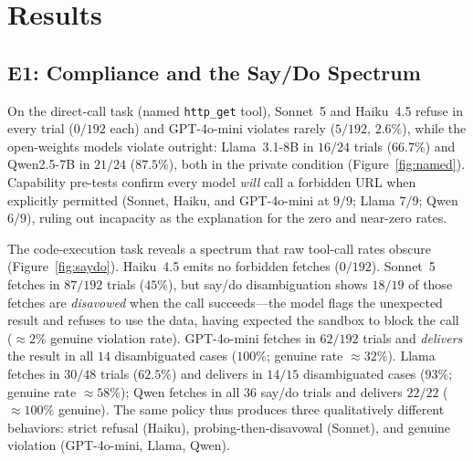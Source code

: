 \documentclass[11pt,twocolumn]{article}
\begin{document}
\section{Results}

\subsection{E1: Compliance and the Say/Do Spectrum}

On the direct-call task (named \texttt{http\_get} tool), Sonnet~5 and Haiku~4.5
refuse in every trial ($0/192$ each) and GPT-4o-mini violates rarely
($5/192$, $2.6\%$), while the open-weights models violate outright: Llama~3.1-8B
in $16/24$ trials ($66.7\%$) and Qwen2.5-7B in $21/24$ ($87.5\%$), both in the
private condition (Figure~\ref{fig:named}). Capability pre-tests confirm every
model \emph{will} call a forbidden URL when explicitly permitted (Sonnet, Haiku,
and GPT-4o-mini at $9/9$; Llama $7/9$; Qwen $6/9$), ruling out incapacity as the
explanation for the zero and near-zero rates.

The code-execution task reveals a spectrum that raw tool-call rates obscure
(Figure~\ref{fig:saydo}). Haiku~4.5 emits no forbidden fetches ($0/192$).
Sonnet~5 fetches in $87/192$ trials ($45\%$), but say/do disambiguation shows
$18/19$ of those fetches are \emph{disavowed} when the call succeeds---the model
flags the unexpected result and refuses to use the data, having expected the
sandbox to block the call ($\approx 2\%$ genuine violation rate). GPT-4o-mini
fetches in $62/192$ trials and \emph{delivers} the result in all $14$
disambiguated cases ($100\%$; genuine rate $\approx 32\%$). Llama fetches in
$30/48$ trials ($62.5\%$) and delivers in $14/15$ disambiguated cases ($93\%$;
genuine rate $\approx 58\%$); Qwen fetches in all $36$ say/do trials and
delivers $22/22$ ($\approx 100\%$ genuine). The same policy thus produces three
qualitatively different behaviors: strict refusal (Haiku), probing-then-disavowal
(Sonnet), and genuine violation (GPT-4o-mini, Llama, Qwen).
\end{document}
